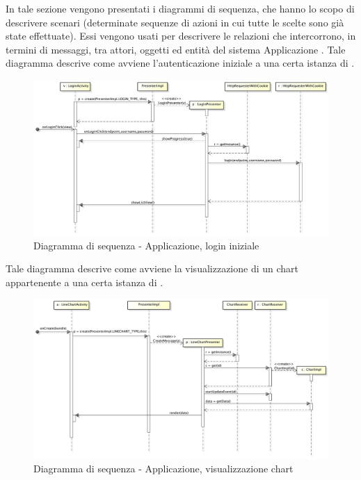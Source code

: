         In tale sezione vengono presentati i diagrammi di sequenza, che hanno lo scopo di descrivere scenari (determinate sequenze di azioni in cui tutte le scelte sono già state effettuate). Essi vengono usati per descrivere le relazioni che intercorrono, in termini di messaggi, tra attori, oggetti ed entità del sistema Applicazione .
            Tale diagramma descrive come avviene l'autenticazione iniziale a una certa istanza di .
            \begin{figure}[H]
                \centering
                \includegraphics[scale=0.3]{DefinizioneDiProdotto/Pics/ApplicazioneLogin}
                \caption{Diagramma di sequenza - Applicazione, login iniziale}
            \end{figure}


            Tale diagramma descrive come avviene la visualizzazione di un chart appartenente a una certa istanza di .
            \begin{figure}[H]
                \centering
                \includegraphics[scale=0.3]{DefinizioneDiProdotto/Pics/ApplicazioneVisualizzazioneChart}
                \caption{Diagramma di sequenza - Applicazione, visualizzazione chart}
            \end{figure}


